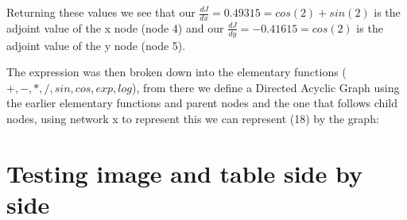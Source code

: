 \documentclass{article}
\begin{document}
Returning these values we see that our $\frac{dJ}{dx} = 0.49315 = cos(2) + sin(2)$ is the adjoint value of the x node (node 4) and our $\frac{dJ}{dy} = -0.41615 = cos(2)$ is the adjoint value of the y node (node 5).

The expression was then broken down into the elementary functions ($+, -, *, /, sin, cos, exp, log$), from there we define a Directed Acyclic Graph using the earlier elementary functions and parent nodes and the one that follows child nodes, using network x to represent this we can represent (18) by the graph:


\section{Testing image and table side by side}

\begin{figure}[h!]
\begin{floatrow}
\end{floatrow}
\end{figure}
\end{document}
